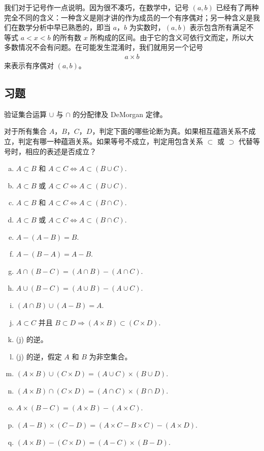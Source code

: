 \documentclass[../../main.tex]{subfiles}
\begin{document}
我们对于记号作一点说明。因为很不凑巧，在数学中，记号 $(a, b)$ 已经有了两种完全不同的含义：一种含义是刚才讲的作为成员的一个有序偶对；另一种含义是我们在数学分析中早已熟悉的，即当 $a$，$b$ 为实数时，$(a, b)$ 表示包含所有满足不等式 $a < x < b$ 的所有数 $x$ 所构成的区间。由于它的含义可依行文而定，所以大多数情况不会有问题。在可能发生混淆时，我们就用另一个记号
\begin{align*}
a \times b
\end{align*}
来表示有序偶对 $(a, b)$。

\subsection*{习题}

\begin{exercise}\label{exercise:ch01-基本概念-1}
验证集合运算 $\cup$ 与 $\cap$ 的分配律及 DeMorgan 定律。
\end{exercise}

\begin{exercise}\label{exercise:ch01-基本概念-2}
对于所有集合 $A$，$B$，$C$，$D$，判定下面的哪些论断为真。如果相互蕴涵关系不成立，判定有哪一种蕴涵关系。如果等号不成立，判定用包含关系 $\subset$ 或 $\supset$ 代替等号时，相应的表述是否成立？
\begin{enumerate}[(a)]
\item $A \subset B$ 和 $A \subset C \Longleftrightarrow A \subset (B \cup C)$.
\item $A \subset B$ 或 $A \subset C \Longleftrightarrow A \subset (B \cup C)$.
\item $A \subset B$ 和 $A \subset C \Longleftrightarrow A \subset (B \cap C)$.
\item $A \subset B$ 或 $A \subset C \Longleftrightarrow A \subset (B \cap C)$.
\item $A - (A - B) = B$.
\item $A - (B - A) = A - B$.
\item $A \cap (B - C) = (A \cap B) - (A \cap C)$.
\item $A \cup (B - C) = (A \cup B) - (A \cup C)$.
\item $(A \cap B) \cup (A - B) = A$.
\item $A \subset C$ 并且 $B \subset D \Longrightarrow (A \times B) \subset (C \times D)$.
\item (j) 的逆。
\item (j) 的逆，假定 $A$ 和 $B$ 为非空集合。
\item $(A \times B) \cup (C \times D) = (A \cup C) \times (B \cup D)$.
\item $(A \times B) \cap (C \times D) = (A \cap C) \times (B \cap D)$.
\item $A \times (B - C) = (A \times B) - (A \times C)$.
\item $(A - B) \times (C - D) = (A \times C - B \times C) - (A \times D)$.
\item $(A \times B) - (C \times D) = (A - C) \times (B - D)$.
\end{enumerate}
\end{exercise}
\end{document}
